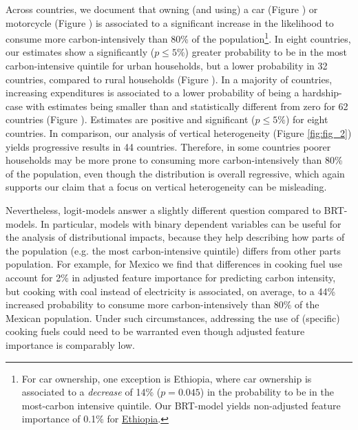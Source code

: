 \documentclass[12pt, a4paper]{article}
\begin{document}
Across countries, we document that owning (and using) a car (Figure ) or motorcycle (Figure ) is associated to a significant increase in the likelihood to consume more carbon-intensively than 80\% of the population\footnote{For car ownership, one exception is Ethiopia, where car ownership is associated to a \textit{decrease} of 14\% ($p=0.045$) in the probability to be in the most-carbon intensive quintile. Our BRT-model yields non-adjusted feature importance of 0.1\% for \hyperref[fig:5b_ETH]{Ethiopia}.}. In eight countries, our estimates show a significantly ($p \leq 5\%$) greater probability to be in the most carbon-intensive quintile for urban households, but a lower probability in 32 countries, compared to rural households (Figure ). In a majority of countries, increasing expenditures is associated to a lower probability of being a hardship-case with estimates being smaller than and statistically different from zero for 62 countries (Figure ). Estimates are positive and significant ($p \leq 5\%$) for eight countries. In comparison, our analysis of vertical heterogeneity (Figure \ref{fig:fig_2}) yields progressive results in 44 countries. Therefore, in some countries poorer households may be more prone to consuming more carbon-intensively than 80\% of the population, even though the distribution is overall regressive, which again supports our claim that a focus on vertical heterogeneity can be misleading.

Nevertheless, logit-models answer a slightly different question compared to BRT-models. In particular, models with binary dependent variables can be useful for the analysis of distributional impacts, because they help describing how parts of the population (e.g. the most carbon-intensive quintile) differs from other parts population. For example, for Mexico we find that differences in cooking fuel use account for 2\% in adjusted feature importance for predicting carbon intensity, but cooking with coal instead of electricity is associated, on average, to a 44\% increased probability to consume more carbon-intensively than 80\% of the Mexican population. Under such circumstances, addressing the use of (specific) cooking fuels could need to be warranted even though adjusted feature importance is comparably low.

\end{document}
